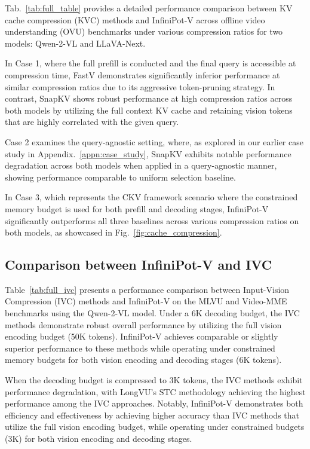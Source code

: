 Tab.~\ref{tab:full_table} provides a detailed performance comparison between KV cache compression (KVC) methods and InfiniPot-V across offline video understanding (OVU) benchmarks under various compression ratios for two models: Qwen-2-VL and LLaVA-Next.

In Case 1, where the full prefill is conducted and the final query is accessible at compression time, FastV demonstrates significantly inferior performance at similar compression ratios due to its aggressive token-pruning strategy. In contrast, SnapKV shows robust performance at high compression ratios across both models by utilizing the full context KV cache and retaining vision tokens that are highly correlated with the given query.

Case 2 examines the query-agnostic setting, where, as explored in our earlier case study in Appendix.~\ref{appn:case_study}, SnapKV exhibits notable performance degradation across both models when applied in a query-agnostic manner, showing performance comparable to uniform selection baseline.

In Case 3, which represents the CKV framework scenario where the constrained memory budget is used for both prefill and decoding stages, InfiniPot-V significantly outperforms all three baselines across various compression ratios on both models, as showcased in Fig.~\ref{fig:cache_compression}.

\subsection{Comparison between InfiniPot-V and IVC}
Table~\ref{tab:full_ivc} presents a performance comparison between Input-Vision Compression (IVC) methods and InfiniPot-V on the MLVU and Video-MME benchmarks using the Qwen-2-VL model. Under a 6K decoding budget, the IVC methods demonstrate robust overall performance by utilizing the full vision encoding budget (50K tokens). InfiniPot-V achieves comparable or slightly superior performance to these methods while operating under constrained memory budgets for both vision encoding and decoding stages (6K tokens).

When the decoding budget is compressed to 3K tokens, the IVC methods exhibit performance degradation, with LongVU's STC methodology achieving the highest performance among the IVC approaches. Notably, InfiniPot-V demonstrates both efficiency and effectiveness by achieving higher accuracy than IVC methods that utilize the full vision encoding budget, while operating under constrained budgets (3K) for both vision encoding and decoding stages. 

